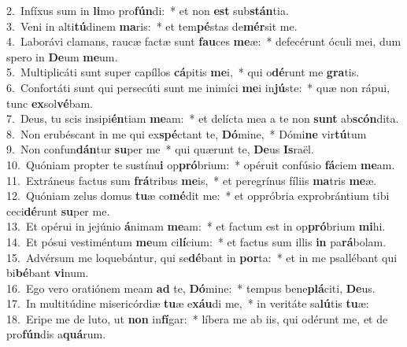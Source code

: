 {2.~}Infíxus sum in \textbf{li}mo pro\textbf{fún}di:~* et non \textbf{est} sub\textbf{stán}tia.\\
{3.~}Veni in alti\textbf{tú}dinem \textbf{ma}ris:~* et tem\textbf{pé}stas de\textbf{mér}sit me.\\
{4.~}Laborávi clamans, raucæ factæ sunt \textbf{fau}ces \textbf{me}æ:~* defecérunt óculi mei, dum spero in \textbf{De}um \textbf{me}um.\\
{5.~}Multiplicáti sunt super capíllos \textbf{cá}pitis \textbf{me}i,~* qui o\textbf{dé}runt me \textbf{gra}tis.\\
{6.~}Confortáti sunt qui persecúti sunt me inimíci \textbf{me}i in\textbf{jú}ste:~* quæ non rápui, tunc \textbf{ex}sol\textbf{vé}bam.\\
{7.~}Deus, tu scis insipi\textbf{én}tiam \textbf{me}am:~* et delícta mea a te non \textbf{sunt} ab\textbf{scón}dita.\\
{8.~}Non erubéscant in me qui ex\textbf{spé}ctant te, \textbf{Dó}mine,~* Dómi\textbf{ne} vir\textbf{tú}tum\\
{9.~}Non confun\textbf{dán}tur \textbf{su}per me~* qui quærunt te, \textbf{De}us \textbf{Is}raël.\\
{10.~}Quóniam propter te sustínu\textbf{i} op\textbf{pró}brium:~* opéruit confúsio \textbf{fá}ciem \textbf{me}am.\\
{11.~}Extráneus factus sum \textbf{frá}tribus \textbf{me}is,~* et peregrínus fíliis \textbf{ma}tris \textbf{me}æ.\\
{12.~}Quóniam zelus domus \textbf{tu}æ co\textbf{mé}dit me:~* et oppróbria exprobrántium tibi ceci\textbf{dé}runt \textbf{su}per me.\\
{13.~}Et opérui in jejúnio \textbf{á}nimam \textbf{me}am:~* et factum est in op\textbf{pró}brium \textbf{mi}hi.\\
{14.~}Et pósui vestiméntum \textbf{me}um ci\textbf{lí}cium:~* et factus sum illis \textbf{in} pa\textbf{rá}bolam.\\
{15.~}Advérsum me loquebántur, qui se\textbf{dé}bant in \textbf{por}ta:~* et in me psallébant qui bi\textbf{bé}bant \textbf{vi}num.\\
{16.~}Ego vero oratiónem meam \textbf{ad} te, \textbf{Dó}mine:~* tempus bene\textbf{plá}citi, \textbf{De}us.\\
{17.~}In multitúdine misericórdiæ \textbf{tu}æ e\textbf{xáu}di me,~* in veritáte sa\textbf{lú}tis \textbf{tu}æ:\\
{18.~}Eripe me de luto, ut \textbf{non} in\textbf{fí}gar:~* líbera me ab iis, qui odérunt me, et de pro\textbf{fún}dis a\textbf{quá}rum.\\
